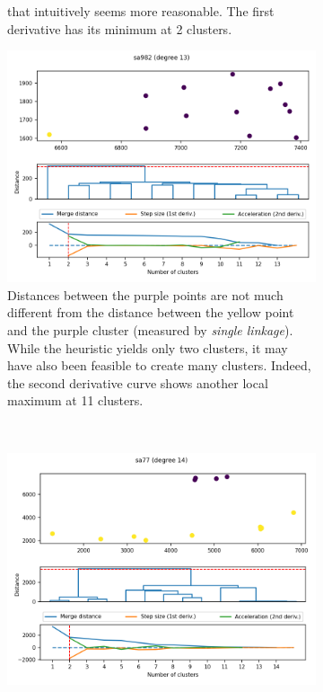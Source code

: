\documentclass[
	fontsize=10pt, %
	twoside=true, %
	secnumdepth=1, %
  toc=indentunnumbered %
]{kaobook}
\begin{document}
\begin{figure}[h]
\begin{subfigure}{0.48\linewidth}
{      that intuitively seems more reasonable. The first derivative has its
      minimum
      at 2 clusters. 
    }
  \end{subfigure}
  \linebreak
      \begin{subfigure}{0.48\linewidth}
        \includegraphics[width=\textwidth]{dendrograms/sa982.png}
        \caption{
          Distances between the purple points are not much
          different from the distance between the yellow point and the purple
          cluster (measured by \textit{single linkage}). While the heuristic yields
          only two clusters, it may have also been feasible to create many clusters.
          Indeed, the second derivative curve shows another local maximum at 11 clusters.
        }
      \end{subfigure}
      ~~~
      \begin{subfigure}{0.48\linewidth}
        \includegraphics[width=\textwidth]{dendrograms/sa77-variance.png}

\end{subfigure}
\end{figure}
\end{document}

